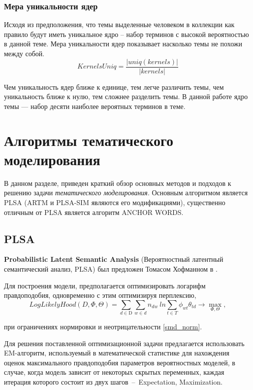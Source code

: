 \documentclass[a4paper, 14pt]{extarticle}
\begin{document}
 	\subsubsection*{Мера уникальности ядер}
 	Исходя из предположения, что темы выделенные человеком в коллекции как правило будут иметь уникальное ядро -- набор терминов с высокой вероятностью в данной теме. Мера уникальности ядер показывает насколько темы не похожи между собой. 
 	\begin{equation}
 		KernelsUniq = \frac{|uniq(kernels)|}{|kernels|}
	\label{uk}
	\end{equation}
 			
 	Чем уникальность ядер ближе к единице, тем легче различить темы, чем уникальность ближе к нулю, тем сложнее разделить темы. В данной работе ядро темы --- набор десяти наиболее вероятных терминов в теме.

\newpage
\section{Алгоритмы тематического моделирования}
В данном разделе, приведен краткий обзор основных методов и подходов к решению задачи \emph{тематического моделирования}. Основным алгоритмом является PLSA (ARTM и PLSA-SIM являются его модификациями), существенно отличным от PLSA является алгоритм ANCHOR WORDS.

\subsection{PLSA}
	\textbf{Probabilistic Latent Semantic Analysis} (Вероятностный латентный семантический анализ, PLSA) был предложен Томасом Хофманном в \cite{Hofmann99}.
	
	Для построения модели, предполагается оптимизировать логарифм правдоподобия, одновременно с этим оптимизируя перплексию,
   	\begin{equation}
   	LogLikelyHood(D, \Phi, \Theta) = \sum_{d \in \mathrm{D}} \sum_{w \in d} n_{dw}~ln \sum_{t \in T} \phi_{wt} \theta_{td} \rightarrow \max_{\Phi,\Theta},
   	\end{equation}
   	
   	при ограничениях нормировки и неотрицательности \ref{smd_norm}.
   	
   	Для решения поставленной оптимизационной задачи предлагается использовать EM-алгоритм, используемый в математической статистике для нахождения оценок максимального правдоподобия параметров вероятностных моделей, в случае, когда модель зависит от некоторых скрытых переменных, каждая итерация которого состоит из двух шагов~--~Expectation, Maximization.  
   	
\end{document}
